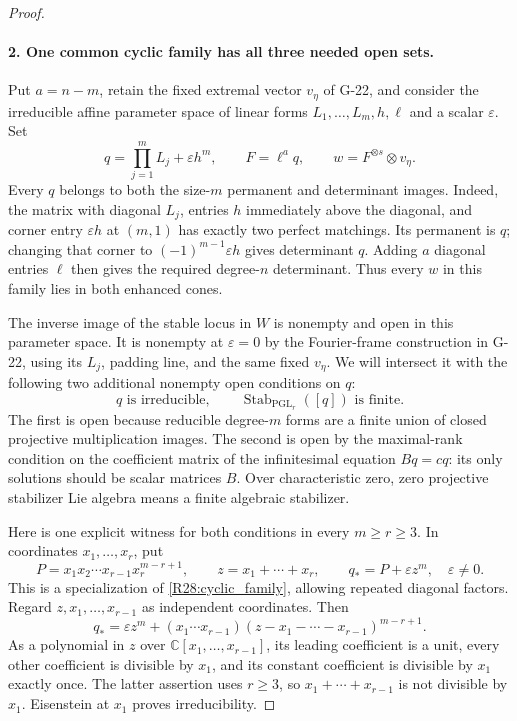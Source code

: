 \begin{proof}
\paragraph{2. One common cyclic family has all three needed open sets.}
Put $a=n-m$, retain the fixed extremal vector $v_\eta$ of
G-22, and consider the irreducible affine parameter space of
linear forms $L_1,\ldots,L_m,h,\ell$ and a scalar $\varepsilon$.
Set
\begin{equation}\label{R28:cyclic_family}
 q=\prod_{j=1}^mL_j+\varepsilon h^m,\qquad
 F=\ell^a q,\qquad w=F^{\otimes s}\otimes v_\eta.
\end{equation}
Every $q$ belongs to both the size-$m$ permanent and determinant
images. Indeed, the matrix with diagonal $L_j$, entries $h$
immediately above the diagonal, and corner entry $\varepsilon h$
at $(m,1)$ has exactly two perfect matchings. Its permanent
is $q$; changing that corner to $(-1)^{m-1}\varepsilon h$
gives determinant $q$. Adding $a$ diagonal entries $\ell$
then gives the required degree-$n$ determinant. Thus every
$w$ in this family lies in both enhanced cones.

The inverse image of the stable locus in $W$ is nonempty and
open in this parameter space. It is nonempty at
$\varepsilon=0$ by the Fourier-frame construction in G-22,
using its $L_j$, padding line, and the same fixed $v_\eta$.
We will intersect it with the following two additional
nonempty open conditions on $q$:
\[
 q\text{ is irreducible},\qquad
 \operatorname{Stab}_{\mathrm{PGL}_r}([q])\text{ is finite}.
\]
The first is open because reducible degree-$m$ forms are a
finite union of closed projective multiplication images.
The second is open by the maximal-rank condition on the
coefficient matrix of the infinitesimal equation
$Bq=cq$: its only solutions should be scalar matrices $B$.
Over characteristic zero, zero projective stabilizer Lie
algebra means a finite algebraic stabilizer.

Here is one explicit witness for both conditions in every
$m\geq r\geq3$. In coordinates $x_1,\ldots,x_r$, put
\begin{equation}\label{R28:explicit_q}
 P=x_1x_2\cdots x_{r-1}x_r^{m-r+1},\qquad
 z=x_1+\cdots+x_r,\qquad q_*=P+\varepsilon z^m,
 \quad\varepsilon\ne0.
\end{equation}
This is a specialization of \eqref{R28:cyclic_family}, allowing
repeated diagonal factors. Regard $z,x_1,\ldots,x_{r-1}$ as
independent coordinates. Then
\[
 q_* = \varepsilon z^m+
       (x_1\cdots x_{r-1})
          (z-x_1-\cdots-x_{r-1})^{m-r+1}.
\]
As a polynomial in $z$ over
$\mathbb C[x_1,\ldots,x_{r-1}]$, its leading coefficient is
a unit, every other coefficient is divisible by $x_1$, and
its constant coefficient is divisible by $x_1$ exactly once.
The latter assertion uses $r\geq3$, so
$x_1+\cdots+x_{r-1}$ is not divisible by $x_1$.
Eisenstein at $x_1$ proves irreducibility.


\end{proof}
